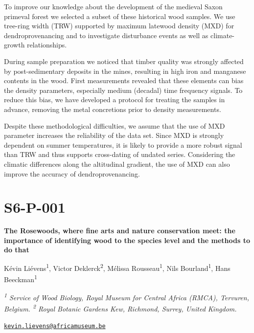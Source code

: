 \documentclass[
]{book}
\begin{document}
To improve our knowledge about the development of the medieval Saxon primeval forest we selected a subset of these historical wood samples. We use tree-ring width (TRW) supported by maximum latewood density (MXD) for dendroprovenancing and to investigate disturbance events as well as climate-growth relationships.

During sample preparation we noticed that timber quality was strongly affected by post-sedimentary deposits in the mines, resulting in high iron and manganese contents in the wood. First measurements revealed that these elements can bias the density parameters, especially medium (decadal) time frequency signals. To reduce this bias, we have developed a protocol for treating the samples in advance, removing the metal concretions prior to density measurements.

Despite these methodological difficulties, we assume that the use of MXD parameter increases the reliability of the data set. Since MXD is strongly dependent on summer temperatures, it is likely to provide a more robust signal than TRW and thus supports cross-dating of undated series. Considering the climatic differences along the altitudinal gradient, the use of MXD can also improve the accuracy of dendroprovenancing.

\hypertarget{s6-p-001}{%
\section*{S6-P-001}\label{s6-p-001}}

\textbf{The Rosewoods, where fine arts and nature conservation meet: the importance of identifying wood to the species level and the methods to do that}

Kévin Liévens\textsuperscript{1}, Victor Deklerck\textsuperscript{2}, Mélissa Rousseau\textsuperscript{1}, Nils Bourland\textsuperscript{1}, Hans Beeckman\textsuperscript{1}

\emph{\textsuperscript{1} Service of Wood Biology, Royal Museum for Central Africa (RMCA), Tervuren, Belgium. \textsuperscript{2} Royal Botanic Gardens Kew, Richmond, Surrey, United Kingdom.}

\href{mailto:kevin.lievens@africamuseum.be}{\nolinkurl{kevin.lievens@africamuseum.be}}
\end{document}
